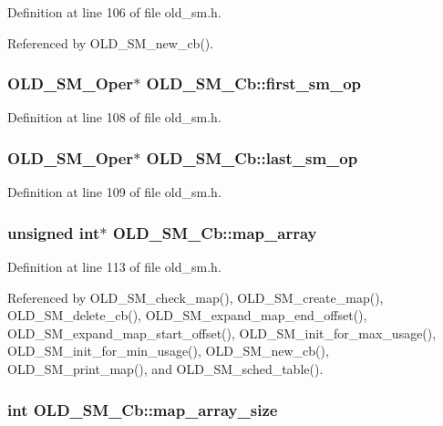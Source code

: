 Definition at line 106 of file old\_\-sm.h.

Referenced by OLD\_\-SM\_\-new\_\-cb().
\subsubsection{\setlength{\rightskip}{0pt plus 5cm}\bf{OLD\_\-SM\_\-Oper}$\ast$ \bf{OLD\_\-SM\_\-Cb::first\_\-sm\_\-op}}\label{structOLD__SM__Cb_958efa3e71de60165c7509750b5ccc0b}




Definition at line 108 of file old\_\-sm.h.
\subsubsection{\setlength{\rightskip}{0pt plus 5cm}\bf{OLD\_\-SM\_\-Oper}$\ast$ \bf{OLD\_\-SM\_\-Cb::last\_\-sm\_\-op}}\label{structOLD__SM__Cb_c4f74b5f9aac0112cb5e647a2de97ee1}




Definition at line 109 of file old\_\-sm.h.
\subsubsection{\setlength{\rightskip}{0pt plus 5cm}unsigned int$\ast$ \bf{OLD\_\-SM\_\-Cb::map\_\-array}}\label{structOLD__SM__Cb_b13ab3afa4920d7b982832f4c59df7d8}




Definition at line 113 of file old\_\-sm.h.

Referenced by OLD\_\-SM\_\-check\_\-map(), OLD\_\-SM\_\-create\_\-map(), OLD\_\-SM\_\-delete\_\-cb(), OLD\_\-SM\_\-expand\_\-map\_\-end\_\-offset(), OLD\_\-SM\_\-expand\_\-map\_\-start\_\-offset(), OLD\_\-SM\_\-init\_\-for\_\-max\_\-usage(), OLD\_\-SM\_\-init\_\-for\_\-min\_\-usage(), OLD\_\-SM\_\-new\_\-cb(), OLD\_\-SM\_\-print\_\-map(), and OLD\_\-SM\_\-sched\_\-table().
\subsubsection{\setlength{\rightskip}{0pt plus 5cm}int \bf{OLD\_\-SM\_\-Cb::map\_\-array\_\-size}}\label{structOLD__SM__Cb_b6bea72701ac60f69544ec61df14cf00}




